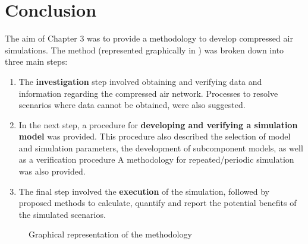 \section{Conclusion}
The aim of Chapter 3 was to provide a methodology to develop compressed air simulations. The method (represented graphically in ) was broken down into three main steps:
\begin{enumerate}
	\item The \textbf{investigation} step involved obtaining and verifying data and information regarding the compressed air network. Processes to resolve scenarios where data cannot be obtained, were also suggested.
	\item In the next step, a procedure for \textbf{developing and verifying a simulation model} was provided. This procedure also described the selection of model and simulation parameters, the development of subcomponent models, as well as a verification procedure A methodology for repeated/periodic simulation was also provided.
	\item The final step involved the \textbf{execution} of the simulation, followed by proposed methods to calculate, quantify and report the potential benefits of the simulated scenarios.
\end{enumerate}
\begin{figure}[h]
	\centering
	\caption{Graphical representation of the methodology}
	\label{fig: flow diagram}
\end{figure}
